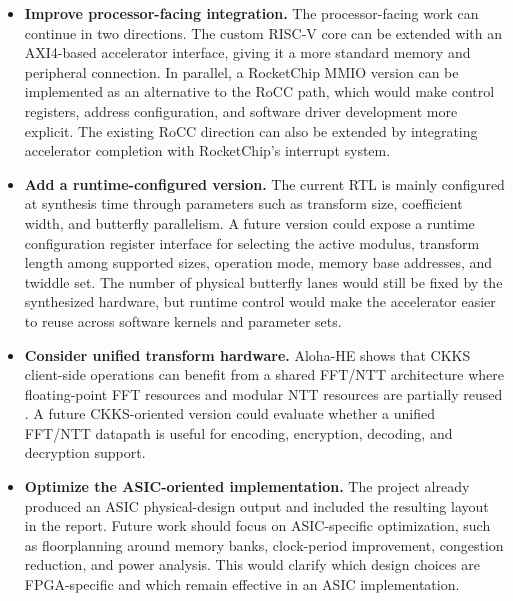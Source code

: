 \documentclass[a4paper, 12pt, titlepage]{article}
\begin{document}
\begin{itemize}
    \item \textbf{Improve processor-facing integration.} The processor-facing work can continue in two directions. The custom RISC-V core can be extended with an AXI4-based accelerator interface, giving it a more standard memory and peripheral connection. In parallel, a RocketChip MMIO version can be implemented as an alternative to the RoCC path, which would make control registers, address configuration, and software driver development more explicit. The existing RoCC direction can also be extended by integrating accelerator completion with RocketChip's interrupt system.

    \item \textbf{Add a runtime-configured version.} The current RTL is mainly configured at synthesis time through parameters such as transform size, coefficient width, and butterfly parallelism. A future version could expose a runtime configuration register interface for selecting the active modulus, transform length among supported sizes, operation mode, memory base addresses, and twiddle set. The number of physical butterfly lanes would still be fixed by the synthesized hardware, but runtime control would make the accelerator easier to reuse across software kernels and parameter sets.

    \item \textbf{Consider unified transform hardware.} Aloha-HE shows that CKKS client-side operations can benefit from a shared FFT/NTT architecture where floating-point FFT resources and modular NTT resources are partially reused \cite{aloha-he}. A future CKKS-oriented version could evaluate whether a unified FFT/NTT datapath is useful for encoding, encryption, decoding, and decryption support.

    \item \textbf{Optimize the ASIC-oriented implementation.} The project already produced an ASIC physical-design output and included the resulting layout in the report. Future work should focus on ASIC-specific optimization, such as floorplanning around memory banks, clock-period improvement, congestion reduction, and power analysis. This would clarify which design choices are FPGA-specific and which remain effective in an ASIC implementation.
\end{itemize}

\newpage


\end{document}
